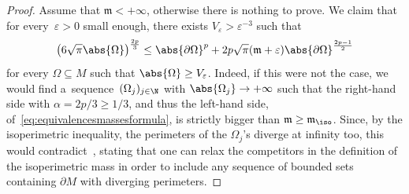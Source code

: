 \documentclass[10pt,a4paper]{amsart}
\numberwithin{equation}{section}
\newcounter{case}
\newcommand{\ma}{\mathfrak{m}}
\begin{document}
\begin{proof} Assume that $\ma<+\infty$, otherwise there is nothing to prove. We claim that for every~${\varepsilon>0}$ small enough, there exists $V_\varepsilon>\varepsilon^{-3}$ such that
\begin{equation}\label{eq:sharp_isoperimetric_inequality}
 \big(6 \sqrt{\pi} \abs{\Omega}\big)^{\frac{2p}{3}} \leq \abs{\partial \Omega}^{p}+ 2p\sqrt{\pi}(\ma+\varepsilon)\abs{ \partial \Omega}^{\frac{2p-1}{2}}
\end{equation}
for every $\Omega \subseteq M$ such that $\abs{\Omega} \geq V_\varepsilon$. Indeed, if this were not the case, we would find a~sequence~$(\Omega_j)_{j \in \N}$ with $\abs{\Omega_j} \to + \infty$ such that the right-hand side with $\alpha=2p/3\geq 1/3$, and thus the left-hand side, of~\eqref{eq:equivalencesmassesformula}, is strictly bigger than $ \ma \geq \ma_{\iso}$. Since, by the isoperimetric inequality, the perimeters of the $\Omega_j$'s diverge at infinity too, this would contradict~\cite[Proposition 37]{jauregui_lowersemicontinuitymass0_2019}, stating that one can relax the competitors in the definition of the isoperimetric mass in order to include any sequence of bounded sets containing $\partial M$ with diverging perimeters.


\end{proof}
\end{document}
